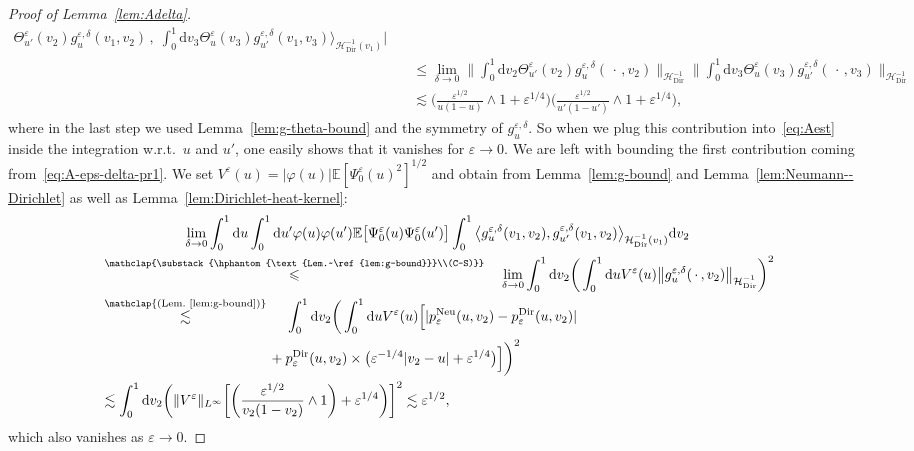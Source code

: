 \documentclass[AHL,Unicode,longabstracts]{cedram}
\DeclareMathOperator{\Dir}{Dir}
\DeclareMathOperator{\Neu}{Neu}
\newcommand{\mc}[1]{{\mathcal #1}}
\renewcommand{\mc}[1]{{\mathcal #1}}
\renewcommand{\leq}{\leqslant}
\newcommand*{\dd}{\mathrm{d}}
\newcommand*{\du}{\dd u}
\newcommand*{\dv}{\dd v}
\begin{document}
\begin{proof}[Proof of Lemma~\ref{lem:Adelta}]
\begin{align*}
\Theta^{\varepsilon}_{u'} (v_2) g^{\varepsilon, \delta}_u (v_1, v_2)\,,\;
\int_0^1 \dv_3 \Theta^{\varepsilon}_u (v_3) g^{\varepsilon,
\delta}_{u'} (v_1, v_3) \bigg\rangle_{\mc H_{\Dir}^{- 1} (v_1)} \bigg|\\
&\quad \leq \lim_{\delta \rightarrow 0} \bigg\| \int_0^1 \dv_2
\Theta^{\varepsilon}_{u'} (v_2) g^{\varepsilon, \delta}_u (\,\cdot\,, v_2)
\bigg\|_{\mc H_{\Dir}^{- 1}} \bigg\| \int_0^1 \dv_3 \Theta^{\varepsilon}_u (v_3) g^{\varepsilon, \delta}_{u'} (\,\cdot\,, v_3) \bigg\|_{\mc H_{\Dir}^{- 1}}\\
&\quad \lesssim \bigg(\frac{\varepsilon^{1/2}}{u (1 - u)} \wedge 1 + \varepsilon^{1/4} \bigg) \bigg(\frac{\varepsilon^{1/2}}{u' (1 - u')} \wedge 1 + \varepsilon^{1/4} \bigg),
\end{align*}
where in the last step we used Lemma~\ref{lem:g-theta-bound} and the symmetry of $g^{\varepsilon, \delta}_u$. So when we plug this contribution into~\eqref{eq:Aest} inside the integration w.r.t.~$u$ and $u'$, one easily shows that it vanishes for $\varepsilon \rightarrow 0$. We are left with bounding the first contribution coming from~\eqref{eq:A-eps-delta-pr1}. We set $V^{\varepsilon} (u) = |\varphi (u) | \mathbb{E} [\Psi^{\varepsilon}_0 (u)^2]^{1 / 2}$ and obtain from Lemma~\ref{lem:g-bound} and Lemma~\ref{lem:Neumann--Dirichlet} as well as Lemma~\ref{lem:Dirichlet-heat-kernel}:
\begingroup
\allowdisplaybreaks
\begin{multline*}
\lim_{\delta \rightarrow 0} \int_0^1 \du \int_0^1 \du' \varphi (u) \varphi (u') \mathbb{E} \big[\Psi^{\varepsilon}_0 (u)\Psi^{\varepsilon}_0 (u')\big] \int_0^1 \big\langle g^{\varepsilon, \delta}_u (v_1, v_2), g^{\varepsilon, \delta}_{u'} (v_1, v_2) \big\rangle_{\mc H_{\Dir}^{- 1} (v_1)} \dv_2\\
\begin{aligned}
& \overset{\mathclap{\substack{\hphantom{\text{Lem.~\ref{lem:g-bound}}}\\(C-S)}}}{\leq} \quad\lim_{\delta \rightarrow 0} \int_0^1 \dv_2 \bigg(\int_0^1 \du V^{\varepsilon} (u) \big\| g^{\varepsilon,\delta}_u (\,\cdot\,, v_2) \big\|_{\mc H_{\Dir}^{- 1}}\bigg)^2\\
& \overset{\mathclap{\text{(Lem.~\ref{lem:g-bound})}}}{\lesssim}\quad\; \int_0^1 \dv_2 \bigg(\int_0^1 \du V^{\varepsilon} (u) \Big[| p^{\Neu}_{\varepsilon} (u, v_2) - p^{\Dir}_{\varepsilon} (u, v_2) | \\*
& \qquad \qquad \qquad \qquad \qquad \qquad + p^{\Dir}_{\varepsilon} (u, v_2) \times \big(\varepsilon^{- 1/4} | v_2 - u | +
\varepsilon^{1/4} \big)\Big] \bigg)^2\\
& \lesssim \int_0^1 \dv_2 \bigg(\| V^{\varepsilon} \|_{L^{\infty}}
\bigg[\bigg(\frac{\varepsilon^{1/2}}{v_2 (1 - v_2)} \wedge 1 \bigg) +
\varepsilon^{1/4} \bigg) \bigg]^2 \lesssim \varepsilon^{1/2},
\end{aligned}
\end{multline*}
which also vanishes as $\varepsilon \rightarrow 0$.
\end{proof}
\endgroup
\end{document}
